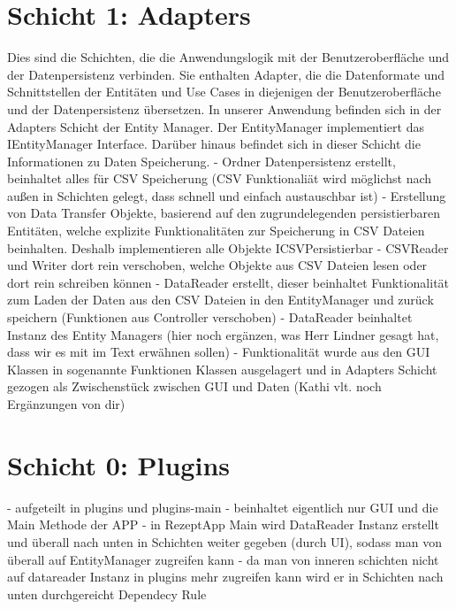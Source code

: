 \section{Schicht 1: Adapters}
Dies sind die Schichten, die die Anwendungslogik mit der Benutzeroberfläche und der Datenpersistenz verbinden. Sie enthalten Adapter, die die Datenformate und Schnittstellen der Entitäten und Use Cases in diejenigen der Benutzeroberfläche und der Datenpersistenz übersetzen.
In unserer Anwendung befinden sich in der Adapters Schicht der Entity Manager. Der EntityManager implementiert das IEntityManager Interface. 
Darüber hinaus befindet sich in dieser Schicht die Informationen zu Daten Speicherung. 
- Ordner Datenpersistenz erstellt, beinhaltet alles für CSV Speicherung (CSV Funktionaliät wird möglichst nach außen in Schichten gelegt, dass schnell und einfach austauschbar ist)
    - Erstellung von Data Transfer Objekte, basierend auf den zugrundelegenden persistierbaren Entitäten, welche explizite Funktionalitäten zur Speicherung in CSV Dateien beinhalten. Deshalb implementieren alle Objekte ICSVPersistierbar
    - CSVReader und Writer dort rein verschoben, welche Objekte aus CSV Dateien lesen oder dort rein schreiben können
    - DataReader erstellt, dieser beinhaltet Funktionalität zum Laden der Daten aus den CSV Dateien in den EntityManager und zurück speichern (Funktionen aus Controller verschoben) 
    - DataReader beinhaltet Instanz des Entity Managers
    (hier noch ergänzen, was Herr Lindner gesagt hat, dass wir es mit im Text erwähnen sollen)
- Funktionalität wurde aus den GUI Klassen in sogenannte Funktionen Klassen ausgelagert und in Adapters Schicht gezogen als Zwischenstück zwischen GUI und Daten (Kathi vlt. noch Ergänzungen von dir)



\section{Schicht 0: Plugins}


- aufgeteilt in plugins und plugins-main
- beinhaltet eigentlich nur GUI und die Main Methode der APP 
- in RezeptApp Main wird DataReader Instanz erstellt und überall nach unten in Schichten weiter gegeben (durch UI), sodass man von überall auf EntityManager zugreifen kann 
- da man von inneren schichten nicht auf datareader Instanz in plugins mehr zugreifen kann wird er in Schichten nach unten durchgereicht Dependecy Rule


